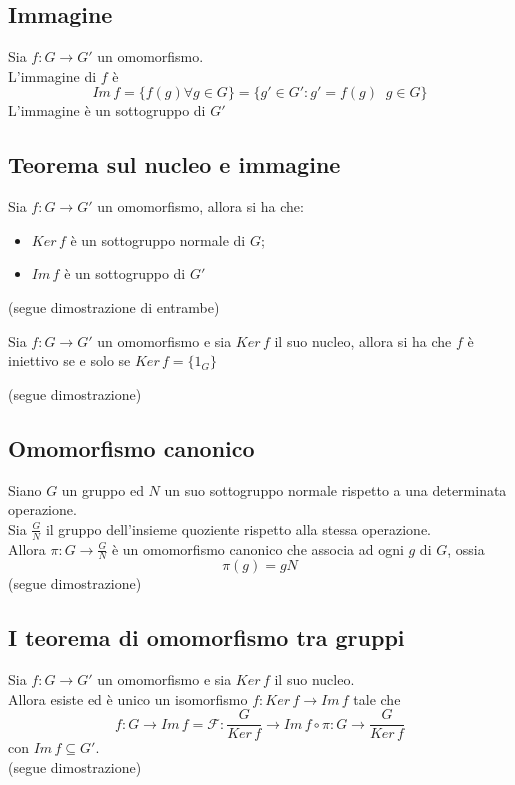 \begin{flushleft}
\subsection{Immagine}
Sia $f:G\to G'$ un omomorfismo.\\
L'immagine di $f$ è
\[Im\,f = \{f(g)\forall g\in G\} = \{g'\in G': g' = f(g)\;\;g\in G\}\]
L'immagine è un sottogruppo di $G'$

\subsection{Teorema sul nucleo e immagine}
Sia $f:G\to G'$ un omomorfismo, allora si ha che:
\begin{itemize}
    \item $Ker\,f$ è un sottogruppo normale di $G$;
    \item $Im\,f$ è un sottogruppo di $G'$
\end{itemize}
(segue dimostrazione di entrambe)
\\ \vspace{300px}

\begin{proprieta}
Sia $f:G\to G'$ un omomorfismo e sia $Ker\,f$ il suo nucleo, allora si ha che $f$ è iniettivo se e solo se $Ker\,f = \{1_G\}$
\end{proprieta}
(segue dimostrazione)
\\ \vspace{300px}

\subsection{Omomorfismo canonico}
Siano $G$ un gruppo ed $N$ un suo sottogruppo normale rispetto a una determinata operazione.\\
Sia $\frac{G}{N}$ il gruppo dell'insieme quoziente rispetto alla stessa operazione.\\
Allora $\pi: G \to \frac{G}{N}$ è un omomorfismo canonico che associa ad ogni $g$ di $G$, ossia
\[\pi(g) = gN\]
(segue dimostrazione)
\\ \vspace{300px}

\subsection{I teorema di omomorfismo tra gruppi}
Sia $f:G\to G'$ un omomorfismo e sia $Ker\,f$ il suo nucleo.\\
Allora esiste ed è unico un isomorfismo $f:Ker\,f \to Im\,f$ tale che
\[f:G \to Im\,f = \mathcal{F}:\frac{G}{Ker\,f} \to Im\,f\circ\pi: G\to \frac{G}{Ker\,f}\]
con $Im\,f \subseteq G'$.\\
(segue dimostrazione)
\\ \vspace{300px}


\end{flushleft}
